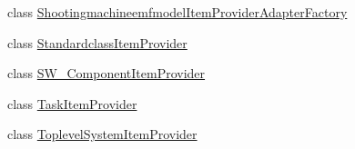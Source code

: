\begin{DoxyCompactItemize}
\item 
class \hyperlink{classshootingmachineemfmodel_1_1provider_1_1_shootingmachineemfmodel_item_provider_adapter_factory}{Shootingmachineemfmodel\-Item\-Provider\-Adapter\-Factory}
\item 
class \hyperlink{classshootingmachineemfmodel_1_1provider_1_1_standardclass_item_provider}{Standardclass\-Item\-Provider}
\item 
class \hyperlink{classshootingmachineemfmodel_1_1provider_1_1_s_w___component_item_provider}{S\-W\-\_\-\-Component\-Item\-Provider}
\item 
class \hyperlink{classshootingmachineemfmodel_1_1provider_1_1_task_item_provider}{Task\-Item\-Provider}
\item 
class \hyperlink{classshootingmachineemfmodel_1_1provider_1_1_toplevel_system_item_provider}{Toplevel\-System\-Item\-Provider}
\end{DoxyCompactItemize}
